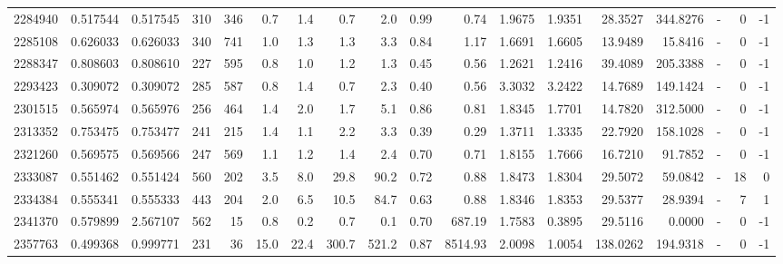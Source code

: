 \begin{tabular}{rrrrrrrrrrrrrrrlrr}
   2284940 & 0.517544 &   0.517545 &  310 &  346 &      0.7 &      1.4 &     0.7 &      2.0 &       0.99 &        0.74 &  1.9675 &  1.9351 &   28.3527 &  344.8276 &             - &        0 &         -1 \\
   2285108 & 0.626033 &   0.626033 &  340 &  741 &      1.0 &      1.3 &     1.3 &      3.3 &       0.84 &        1.17 &  1.6691 &  1.6605 &   13.9489 &   15.8416 &             - &        0 &         -1 \\
   2288347 & 0.808603 &   0.808610 &  227 &  595 &      0.8 &      1.0 &     1.2 &      1.3 &       0.45 &        0.56 &  1.2621 &  1.2416 &   39.4089 &  205.3388 &             - &        0 &         -1 \\
   2293423 & 0.309072 &   0.309072 &  285 &  587 &      0.8 &      1.4 &     0.7 &      2.3 &       0.40 &        0.56 &  3.3032 &  3.2422 &   14.7689 &  149.1424 &             - &        0 &         -1 \\
   2301515 & 0.565974 &   0.565976 &  256 &  464 &      1.4 &      2.0 &     1.7 &      5.1 &       0.86 &        0.81 &  1.8345 &  1.7701 &   14.7820 &  312.5000 &             - &        0 &         -1 \\
   2313352 & 0.753475 &   0.753477 &  241 &  215 &      1.4 &      1.1 &     2.2 &      3.3 &       0.39 &        0.29 &  1.3711 &  1.3335 &   22.7920 &  158.1028 &             - &        0 &         -1 \\
   2321260 & 0.569575 &   0.569566 &  247 &  569 &      1.1 &      1.2 &     1.4 &      2.4 &       0.70 &        0.71 &  1.8155 &  1.7666 &   16.7210 &   91.7852 &             - &        0 &         -1 \\
   2333087 & 0.551462 &   0.551424 &  560 &  202 &      3.5 &      8.0 &    29.8 &     90.2 &       0.72 &        0.88 &  1.8473 &  1.8304 &   29.5072 &   59.0842 &             - &       18 &          0 \\
   2334384 & 0.555341 &   0.555333 &  443 &  204 &      2.0 &      6.5 &    10.5 &     84.7 &       0.63 &        0.88 &  1.8346 &  1.8353 &   29.5377 &   28.9394 &             - &        7 &          1 \\
   2341370 & 0.579899 &   2.567107 &  562 &   15 &      0.8 &      0.2 &     0.7 &      0.1 &       0.70 &      687.19 &  1.7583 &  0.3895 &   29.5116 &    0.0000 &             - &        0 &         -1 \\
   2357763 & 0.499368 &   0.999771 &  231 &   36 &     15.0 &     22.4 &   300.7 &    521.2 &       0.87 &     8514.93 &  2.0098 &  1.0054 &  138.0262 &  194.9318 &             - &        0 &         -1 \\

\end{tabular}

